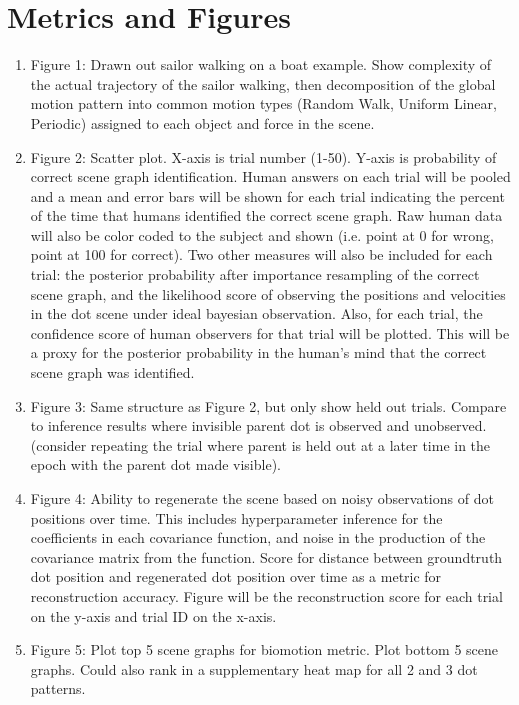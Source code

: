\documentclass{scrartcl}
\begin{document}
\section{Metrics and Figures}
\begin{enumerate}
  \item Figure 1: Drawn out sailor walking on a boat example. Show complexity of the actual trajectory of the sailor walking, then decomposition of the global motion pattern into common motion types (Random Walk, Uniform Linear, Periodic) assigned to each object and force in the scene.

  \item Figure 2: Scatter plot. X-axis is trial number (1-50). Y-axis is probability of correct scene graph identification. Human answers on each trial will be pooled and a mean and error bars will be shown for each trial indicating the percent of the time that humans identified the correct scene graph. Raw human data will also be color coded to the subject and shown (i.e. point at 0 for wrong, point at 100 for correct). Two other measures will also be included for each trial: the posterior probability after importance resampling of the correct scene graph, and the likelihood score of observing the positions and velocities in the dot scene under ideal bayesian observation. Also, for each trial, the confidence score of human observers for that trial will be plotted. This will be a proxy for the posterior probability in the human's mind that the correct scene graph was identified.

  \item Figure 3: Same structure as Figure 2, but only show held out trials. Compare to inference results where invisible parent dot is observed and unobserved. (consider repeating the trial where parent is held out at a later time in the epoch with the parent dot made visible). 

  \item Figure 4: Ability to regenerate the scene based on noisy observations of dot positions over time. This includes hyperparameter inference for the coefficients in each covariance function, and noise in the production of the covariance matrix from the function. Score for distance between groundtruth dot position and regenerated dot position over time as a metric for reconstruction accuracy. Figure will be the reconstruction score for each trial on the y-axis and trial ID on the x-axis. 
 
  \item Figure 5: Plot top 5 scene graphs for biomotion metric. Plot bottom 5 scene graphs. Could also rank in a supplementary heat map for all 2 and 3 dot patterns. 
\end{enumerate}
  
\end{document}
